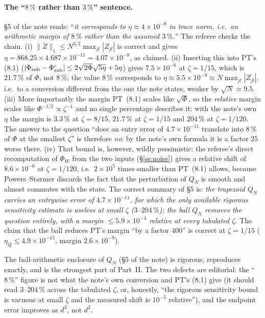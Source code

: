 \documentclass[11pt]{article}
\begin{document}
\paragraph{The ``$8\,\%$ rather than $3\,\%$'' sentence.}  \S5 of the note reads: ``\emph{it
corresponds to $\eta\approx4\times10^{-8}$ in trace norm, i.e.\ an arithmetic margin of $8\,\%$
rather than the assumed $3\,\%$.}''  The referee checks the chain.  (i)
$\|Z\|_1\le N^{3/2}\max_{jl}|Z_{jl}|$ is correct and gives
$\eta=868.25\times4.687\times10^{-11}=4.07\times10^{-8}$, as claimed.  (ii) Inserting this into PT's
(8.1) ($|\Phi_{\rm sub}-\Phi^{\rm c}_{\rm sub}|\le2\sqrt{2\Phi}\sqrt{5\eta}+5\eta$) gives
$7.5\times10^{-6}$ at $\zeta=1/15$, which is $21.7\,\%$ of $\Phi$, not $8\,\%$; the value $8\,\%$
corresponds to $\eta\approx5.5\times10^{-9}\approx N\max_{jl}|Z_{jl}|$, i.e.\ to a conversion
different from the one the note states, weaker by $\sqrt N\approx9.5$.  (iii) More importantly the
margin PT~(8.1) scales like $\sqrt\Phi$, so the \emph{relative} margin scales like
$\Phi^{-1/2}\propto\zeta^{-1}$ and no single percentage describes it: with the note's own $\eta$ the
margin is $3.3\,\%$ at $\zeta=8/15$, $21.7\,\%$ at $\zeta=1/15$ and $204\,\%$ at $\zeta=1/120$.
The answer to the question ``does an entry error of $4.7\times10^{-11}$ translate into $8\,\%$ of
$\Phi$ at the smallest $\zeta$'' is therefore \emph{no}: by the note's own formula it is a factor
$25$ worse there.  (iv) That bound is, however, wildly pessimistic: the referee's direct
recomputation of $\Phi_W$ from the two inputs (\S\ref{ss:noise}) gives a relative shift of
$8.6\times10^{-6}$ at $\zeta=1/120$, i.e.\ $2\times10^{5}$ times smaller than
PT~(8.1) allows, because Powers--St\o rmer discards the fact that the perturbation of $Q_N$
is smooth and almost commutes with the state.  The correct summary of \S5 is: \emph{the trapezoid
$Q_N$ carries an entrywise error of $4.7\times10^{-11}$, for which the only available rigorous
sensitivity estimate is useless at small $\zeta$ ($3$--$204\,\%$); the ball $Q_N$ removes the
question entirely, with a margin $\le5.9\times10^{-4}$ relative at every tabulated $\zeta$.}
The claim that the ball reduces PT's margin ``by a factor $400$'' is correct at $\zeta=1/15$
($\eta_Q\le4.9\times10^{-15}$, margin $2.6\times10^{-9}$).

\begin{verdictok}
The ball-arithmetic enclosure of $Q_N$ (\S5 of the note) is rigorous, reproduces exactly, and is the
strongest part of Part~II.  The two defects are editorial: the ``$8\,\%$'' figure is not what the
note's own conversion and PT's (8.1) give (it should read $3$--$204\,\%$ across the
tabulated $\zeta$, or, honestly, ``the rigorous sensitivity bound is vacuous at small $\zeta$ and the
measured shift is $10^{-5}$ relative''), and the endpoint error improves as $d^3$, not $d^2$.
\end{verdictok}
\end{document}
